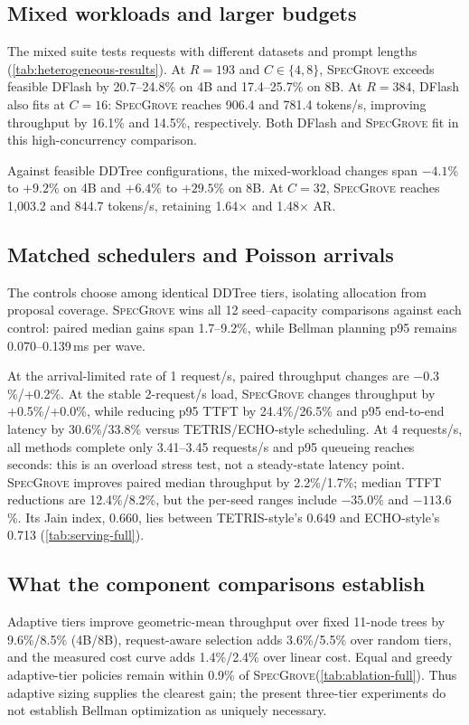 \documentclass{article}
\newcommand{\method}{\textsc{SpecGrove}\xspace}
\begin{document}
\subsection{Mixed workloads and larger budgets}
\label{sec:mixed}
The mixed suite tests requests with different datasets and prompt lengths (\cref{tab:heterogeneous-results}). At $R=193$ and $C\in\{4,8\}$, \method exceeds feasible DFlash by 20.7--24.8\% on 4B and 17.4--25.7\% on 8B. At $R=384$, DFlash also fits at $C=16$: \method reaches 906.4 and 781.4 tokens/s, improving throughput by 16.1\% and 14.5\%, respectively. Both DFlash and \method fit in this high-concurrency comparison.


Against feasible DDTree configurations, the mixed-workload changes span $-4.1$\% to $+9.2$\% on 4B and $+6.4$\% to $+29.5$\% on 8B. At $C=32$, \method reaches 1,003.2 and 844.7 tokens/s, retaining 1.64$\times$ and 1.48$\times$ AR.

\subsection{Matched schedulers and Poisson arrivals}
\label{sec:serving}
The controls choose among identical DDTree tiers, isolating allocation from proposal coverage. \method wins all 12 seed--capacity comparisons against each control: paired median gains span 1.7--9.2\%, while Bellman planning p95 remains 0.070--0.139\,ms per wave.

At the arrival-limited rate of 1 request/s, paired throughput changes are $-0.3$\%/+0.2\%. At the stable 2-request/s load, \method changes throughput by +0.5\%/+0.0\%, while reducing p95 TTFT by 24.4\%/26.5\% and p95 end-to-end latency by 30.6\%/33.8\% versus TETRIS/ECHO-style scheduling. At 4 requests/s, all methods complete only 3.41--3.45 requests/s and p95 queueing reaches seconds: this is an overload stress test, not a steady-state latency point. \method improves paired median throughput by 2.2\%/1.7\%; median TTFT reductions are 12.4\%/8.2\%, but the per-seed ranges include $-35.0$\% and $-113.6$\%. Its Jain index, 0.660, lies between TETRIS-style's 0.649 and ECHO-style's 0.713 (\cref{tab:serving-full}).

\subsection{What the component comparisons establish}
\label{sec:ablations}




Adaptive tiers improve geometric-mean throughput over fixed 11-node trees by 9.6\%/8.5\% (4B/8B), request-aware selection adds 3.6\%/5.5\% over random tiers, and the measured cost curve adds 1.4\%/2.4\% over linear cost. Equal and greedy adaptive-tier policies remain within 0.9\% of \method (\cref{tab:ablation-full}). Thus adaptive sizing supplies the clearest gain; the present three-tier experiments do not establish Bellman optimization as uniquely necessary.
\end{document}

